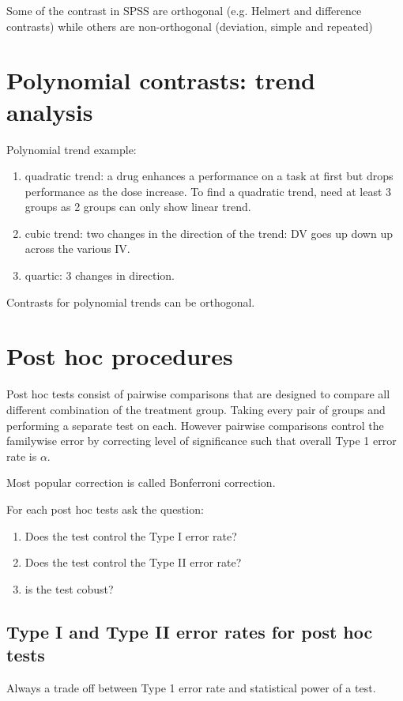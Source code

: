 Some of the contrast in SPSS are orthogonal (e.g. Helmert and difference contrasts) while others are non-orthogonal (deviation, simple and repeated)

\section{Polynomial contrasts: trend analysis}
Polynomial trend example: 
\begin{enumerate}
\item quadratic trend:  a drug enhances a performance on a task at first but drops performance as the dose increase. To find a quadratic trend, need at least 3 groups as 2 groups can only show linear trend. 
\item cubic trend: two changes in the direction of the trend: DV goes up down up across the various IV. 
\item quartic: 3 changes in direction.
\end{enumerate}

Contrasts for polynomial trends can be orthogonal.

\section{Post hoc procedures}
Post hoc tests consist of pairwise comparisons that are designed to compare all different combination of the treatment group. Taking every pair of groups and performing a separate test on each. However pairwise comparisons control the familywise error by correcting level of significance such that overall Type 1 error rate is $\alpha$. 

Most popular correction is called Bonferroni correction. 

For each post hoc tests ask the question:
\begin{enumerate}
\item Does the test control the Type I error rate?
\item Does the test control the Type II error rate?
\item is the test cobust?
\end{enumerate}

\subsection{Type I and Type II error rates for post hoc tests}

Always a trade off between Type 1 error rate and statistical power of a test.

